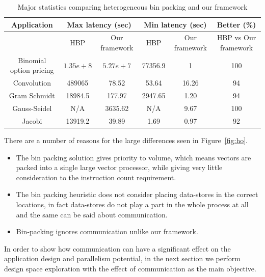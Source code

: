 \begin{table}[t!]
  \centering
  \begin{tabular}{|c|c|c|c|c|c|}
    \hline
    \textbf{Application} &
    \multicolumn{2}{|c|}{\textbf{Max latency (sec)}} &
    \multicolumn{2}{|c|}{\textbf{Min latency (sec)}} &
    \textbf{Better (\%)} \\
    \hline
    & {HBP} & {Our framework} &
    {HBP} & {Our framework} & HBP vs Our framework\\
    \hline
    Binomial option pricing & $1.35e+8$ & $5.27e+7$ & 77356.9 & 1 & 100 \\
    \hline
    Convolution & 489065 & 78.52 & 53.64 & 16.26 & 94\\
    \hline
    Gram Schmidt & 18984.5 & 177.97 & 2947.65 & 1.20 & 94\\
    \hline
    Gauss-Seidel & N/A & 3635.62 & N/A & 9.67 & 100\\
    \hline
    Jacobi & 13919.2 & 39.89 & 1.69 & 0.97 & 92\\
    \hline
  \end{tabular}
  \caption{Major statistics comparing heterogeneous bin packing and our framework}
  \label{tab:2}
\end{table}

There are a number of reasons for the large differences seen in
Figure~\ref{fig:ho}.

\begin{itemize}

\item The bin packing solution gives priority to volume, which means
  vectors are packed into a single large vector processor, while giving
  very little consideration to the instruction count requirement.

\item The bin packing heuristic does not consider placing data-stores in
  the correct locations, in fact data-stores do not play a part in the
  whole process at all and the same can be said about communication.

\item Bin-packing ignores communication unlike our framework.

\end{itemize}

In order to show how communication can have a significant
effect on the application design and parallelism potential, in the next
section we perform design space exploration with the effect
of communication as the main objective.

